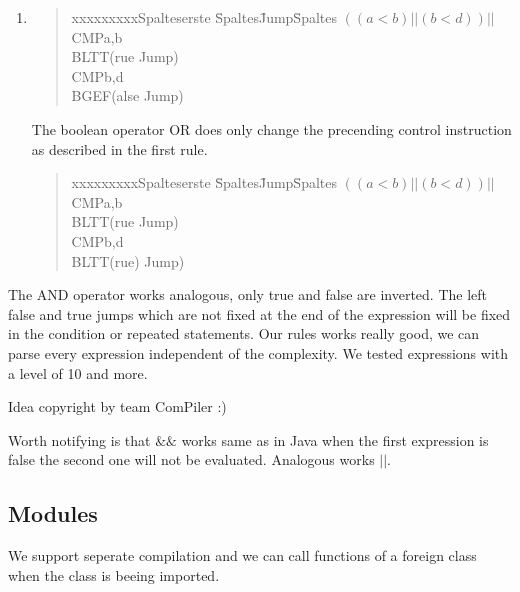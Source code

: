 \begin{enumerate}
\begin{verbatim}
\end{verbatim}

  \item   
  \begin{quote}
	\begin{tabbing}
	xxxxxxxxxSpalteserste \= Spaltes\=  Jump\= Spaltes \kill
	$((a<b) ||  (b<d))||$\>CMP\>a,b\\
	\>BLT\>\>T(rue Jump)\\
	\>CMP\>b,d\\
	\>BGE\>\>F(alse Jump)\\
	\end{tabbing}
	\end{quote}
The boolean operator OR does only change the precending control instruction as described in the first rule.
  \begin{quote}
	\begin{tabbing}
	xxxxxxxxxSpalteserste \= Spaltes\=  Jump\= Spaltes \kill
	$((a<b) ||  (b<d))||$\>CMP\>a,b\\
	\>BLT\>\>T(rue Jump)\\
	\>CMP\>b,d\\
	\>BLT\>\>T(rue) Jump)\\
	\end{tabbing}
	\end{quote}
\end{enumerate}
The AND operator works analogous, only true and false are inverted. The left false and true jumps which are not fixed at the end of the
expression will be fixed in the condition or repeated statements. Our rules works
really good, we can parse every expression independent of the complexity. We tested expressions with a level of 10 and more. \begin{small}
                                                          Idea copyright by team ComPiler :)
                                                          \end{small}
Worth notifying is that $\&\&$ works same as in Java when the first
expression is false the second one will not be evaluated. Analogous works $||$.
\subsection{Modules}
We support seperate compilation and we can call functions of a foreign class when the class is beeing imported.

